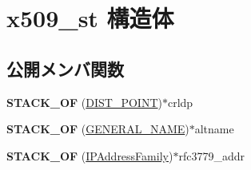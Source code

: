 \hypertarget{structx509__st}{}\section{x509\+\_\+st 構造体}
\label{structx509__st}
\subsection*{公開メンバ関数}
\begin{DoxyCompactItemize}
\item 
\hypertarget{structx509__st_a6cb65861dcb792d87890642d20616234}{}{\bfseries S\+T\+A\+C\+K\+\_\+\+O\+F} (\hyperlink{struct_d_i_s_t___p_o_i_n_t__st}{D\+I\+S\+T\+\_\+\+P\+O\+I\+N\+T})$\ast$crldp\label{structx509__st_a6cb65861dcb792d87890642d20616234}

\item 
\hypertarget{structx509__st_afa1fd8534e0b89a8a3dc70981fcb0219}{}{\bfseries S\+T\+A\+C\+K\+\_\+\+O\+F} (\hyperlink{struct_g_e_n_e_r_a_l___n_a_m_e__st}{G\+E\+N\+E\+R\+A\+L\+\_\+\+N\+A\+M\+E})$\ast$altname\label{structx509__st_afa1fd8534e0b89a8a3dc70981fcb0219}

\item 
\hypertarget{structx509__st_aa930b971d6a43358116e931a23164a69}{}{\bfseries S\+T\+A\+C\+K\+\_\+\+O\+F} (\hyperlink{struct_i_p_address_family__st}{I\+P\+Address\+Family})$\ast$rfc3779\+\_\+addr\label{structx509__st_aa930b971d6a43358116e931a23164a69}

\end{DoxyCompactItemize}
